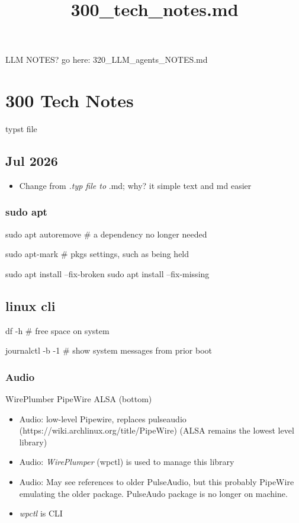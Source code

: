 \documentclass[
  letterpaper,
  DIV=11,
  numbers=noendperiod]{scrartcl}
\title{300\_tech\_notes.md}
\author{}
\date{}
\providecommand{\tightlist}{%
  \setlength{\itemsep}{0pt}\setlength{\parskip}{0pt}}\usepackage{longtable,booktabs,array}
\renewcommand*\contentsname{Table of contents}
\newcommand\contentsname{Table of contents}
\begin{document}
\maketitle

\renewcommand*\contentsname{Table of contents}
{
\hypersetup{linkcolor=}
\setcounter{tocdepth}{3}
\tableofcontents
}

LLM NOTES? go here: 320\_LLM\_agents\_NOTES.md

\section{300 Tech Notes}\label{tech-notes}

typst file

\subsection{Jul 2026}\label{jul-2026}

\begin{itemize}
\tightlist
\item
  Change from \emph{.typ file to }.md; why? it simple text and md easier
\end{itemize}

\subsubsection{sudo apt}\label{sudo-apt}

sudo apt autoremove \# a dependency no longer needed

sudo apt-mark \# pkgs settings, such as being held

sudo apt install --fix-broken sudo apt install --fix-missing

\subsection{linux cli}\label{linux-cli}

df -h \# free space on system

journalctl -b -1 \# show system messages from prior boot

\subsubsection{Audio}\label{audio}

WirePlumber PipeWire ALSA (bottom)

\begin{itemize}
\tightlist
\item
  Audio: low-level Pipewire, replaces pulseaudio
  (https://wiki.archlinux.org/title/PipeWire) (ALSA remains the lowest
  level library)
\item
  Audio: \emph{WirePlumper} (wpctl) is used to manage this library
\item
  Audio: May see references to older PulseAudio, but this probably
  PipeWire emulating the older package. PulseAudo package is no longer
  on machine.
\item
  \emph{wpctl} is CLI
\end{itemize}
\end{document}

